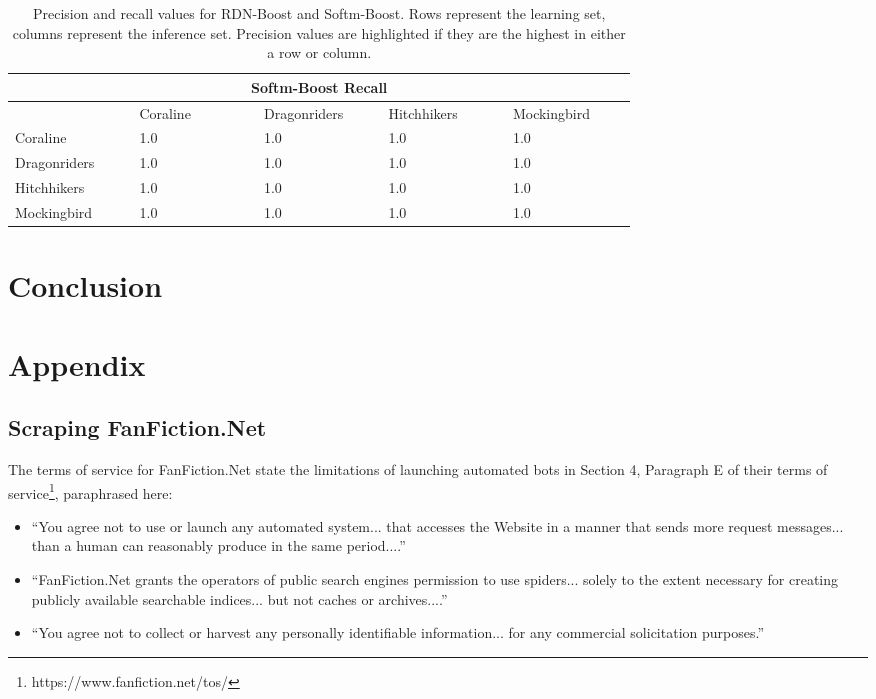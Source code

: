 \documentclass[letterpaper]{article}
\begin{document}
\begin{table}[ht]
        \begin{tabular}{|p{0.15\linewidth}|p{0.15\linewidth}|p{0.15\linewidth}|p{0.15\linewidth}|p{0.15\linewidth}|}
        \hline
        \multicolumn{5}{|c|}{Softm-Boost Recall}\\
        \hline
            & Coraline & Dragonriders & Hitchhikers & Mockingbird \\
            \hline
             Coraline & 1.0 & 1.0 & 1.0 & 1.0 \\
             Dragonriders & 1.0 & 1.0 & 1.0 & 1.0 \\
             Hitchhikers & 1.0 & 1.0 & 1.0 & 1.0 \\
             Mockingbird & 1.0 & 1.0 & 1.0 & 1.0 \\
        \hline
        \end{tabular}

    \caption{Precision and recall values for RDN-Boost and Softm-Boost. Rows represent the learning set, columns represent the inference set. Precision values are highlighted if they are the highest in either a row or column.}
    \label{tab:results}

\end{table}

\section{Conclusion}

\section{Appendix}

\subsection{Scraping FanFiction.Net}

The terms of service for FanFiction.Net state the limitations of launching automated bots in Section 4, Paragraph E of their terms of service\footnote{https://www.fanfiction.net/tos/}, paraphrased here:

\begin{itemize}
    \item ``You agree not to use or launch any automated system... that accesses the Website in a manner that sends more request messages... than a human can reasonably produce in the same period....''
    \item ``FanFiction.Net grants the operators of public search engines permission to use spiders... solely to the extent necessary for creating publicly available searchable indices... but not caches or archives....''
    \item ``You agree not to collect or harvest any personally identifiable information... for any commercial solicitation purposes.''
\end{itemize}
\end{document}
